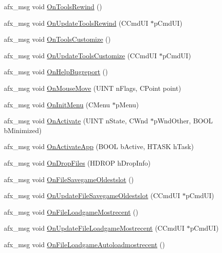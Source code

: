\begin{DoxyCompactItemize}
\item 
afx\+\_\+msg void \mbox{\hyperlink{class_main_wnd_a70093f3937e2d2c45832749226e6eab5}{On\+Tools\+Rewind}} ()
\item 
afx\+\_\+msg void \mbox{\hyperlink{class_main_wnd_a540e2396272cb013f8490fe1a6c6e27c}{On\+Update\+Tools\+Rewind}} (C\+Cmd\+UI $\ast$p\+Cmd\+UI)
\item 
afx\+\_\+msg void \mbox{\hyperlink{class_main_wnd_a37f9cc51f47fe32648f937b8ff64e955}{On\+Tools\+Customize}} ()
\item 
afx\+\_\+msg void \mbox{\hyperlink{class_main_wnd_a628bccba9f50a91d0c37e23c7cecaf8a}{On\+Update\+Tools\+Customize}} (C\+Cmd\+UI $\ast$p\+Cmd\+UI)
\item 
afx\+\_\+msg void \mbox{\hyperlink{class_main_wnd_aa2ca8cf6faaa7a20d52785029767c50f}{On\+Help\+Bugreport}} ()
\item 
afx\+\_\+msg void \mbox{\hyperlink{class_main_wnd_a487d640fdc35218fbe8fd5d917cb104f}{On\+Mouse\+Move}} (U\+I\+NT n\+Flags, C\+Point point)
\item 
afx\+\_\+msg void \mbox{\hyperlink{class_main_wnd_a7bb12340c3ca647cc23d751319302225}{On\+Init\+Menu}} (C\+Menu $\ast$p\+Menu)
\item 
afx\+\_\+msg void \mbox{\hyperlink{class_main_wnd_a13b06fced945b76eb11328fb66f70123}{On\+Activate}} (U\+I\+NT n\+State, C\+Wnd $\ast$p\+Wnd\+Other, B\+O\+OL b\+Minimized)
\item 
afx\+\_\+msg void \mbox{\hyperlink{class_main_wnd_af5891778521ca0b293453e8d6be97533}{On\+Activate\+App}} (B\+O\+OL b\+Active, H\+T\+A\+SK h\+Task)
\item 
afx\+\_\+msg void \mbox{\hyperlink{class_main_wnd_a360d0179bc8f8ae13dfb4cdf573e2c55}{On\+Drop\+Files}} (H\+D\+R\+OP h\+Drop\+Info)
\item 
afx\+\_\+msg void \mbox{\hyperlink{class_main_wnd_a946615293a97e8d381bb34bee4d7ff24}{On\+File\+Savegame\+Oldestslot}} ()
\item 
afx\+\_\+msg void \mbox{\hyperlink{class_main_wnd_ac037eba8953facb1e191ad0b4bb6ff39}{On\+Update\+File\+Savegame\+Oldestslot}} (C\+Cmd\+UI $\ast$p\+Cmd\+UI)
\item 
afx\+\_\+msg void \mbox{\hyperlink{class_main_wnd_aafa7776c35ba50c4244cb22650f15337}{On\+File\+Loadgame\+Mostrecent}} ()
\item 
afx\+\_\+msg void \mbox{\hyperlink{class_main_wnd_ae97e51d61f89103a934b4f55ed09c4d9}{On\+Update\+File\+Loadgame\+Mostrecent}} (C\+Cmd\+UI $\ast$p\+Cmd\+UI)
\item 
afx\+\_\+msg void \mbox{\hyperlink{class_main_wnd_af53d8941c90b605bfa148a2a74c9f178}{On\+File\+Loadgame\+Autoloadmostrecent}} ()

\end{DoxyCompactItemize}
